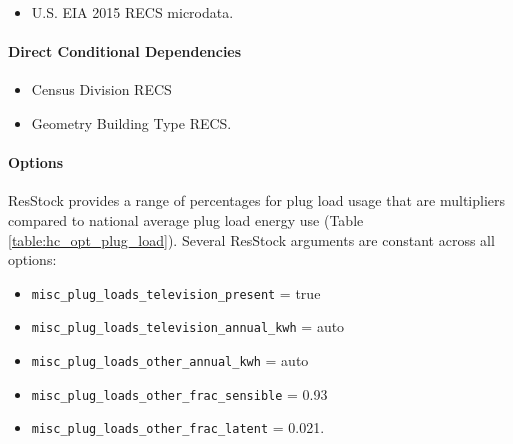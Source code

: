 \begin{itemize}
 
\item
  U.S. EIA 2015 RECS microdata.
\end{itemize}

\paragraph{Direct Conditional Dependencies}
\begin{itemize}
    \item Census Division RECS
    \item Geometry Building Type RECS.
\end{itemize}

\paragraph{Options}

ResStock provides a range of percentages for plug load usage that are multipliers compared to national average plug load energy use (Table \ref{table:hc_opt_plug_load}). Several ResStock arguments are constant across all options:
\begin{itemize}
    \item \texttt{misc\_plug\_loads\_television\_present} = true
    \item \texttt{misc\_plug\_loads\_television\_annual\_kwh} = auto
    \item \texttt{misc\_plug\_loads\_other\_annual\_kwh} = auto
    \item \texttt{misc\_plug\_loads\_other\_frac\_sensible} = 0.93
    \item \texttt{misc\_plug\_loads\_other\_frac\_latent} = 0.021.
\end{itemize}


